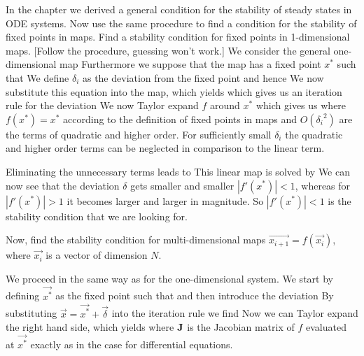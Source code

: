 
In the chapter we derived a general condition for the stability of steady states in ODE systems. Now use the same procedure to find a condition for the stability of fixed points in maps. 
\subquestion Find a stability condition for fixed points in 1-dimensional maps. [Follow the procedure, guessing won't work.]
\solution  
We consider the general one-dimensional map 
Furthermore we suppose that the map has a fixed point $x^*$ such that 
We define $\delta_i$ as the deviation from the fixed point
and hence 
We now substitute this equation into the map, which yields 
which gives us an iteration rule for the deviation 
We now Taylor expand $f$ around $x^*$ which gives us 
where $f(x^*)=x^*$ according to the definition of fixed points in maps and $O({\delta_i}^2)$ are the terms of quadratic and higher order. For sufficiently small $\delta_i$ the quadratic and higher order terms can be neglected in comparison to the linear term.  

Eliminating the unnecessary terms leads to 
This linear map is solved by  
We can now see that the deviation $\delta$ gets smaller and smaller $|f'(x^*)|<1$, whereas for $|f'(x^*)|>1$ it becomes larger and larger in magnitude. So $|f'(x^*)|<1$ is the stability condition that we are looking for.  

\subquestion
Now, find the stability condition for multi-dimensional maps $\vec{x_{i+1}}=f(\vec{x_i})$, where $\vec{x_i}$ is a vector of dimension $N$.

\solution
We proceed in the same way as for the one-dimensional system. We start by defining $\vec{x^*}$ as the fixed point such that 
and then introduce the deviation 
By substituting $\vec{x} = \vec{x^*} + \vec{\delta} $ into the iteration rule we find 
Now we can Taylor expand the right hand side, which yields
where $\bf J$ is the Jacobian matrix of $f$ evaluated at $\vec{x^*}$ exactly as in the case for differential equations. 

